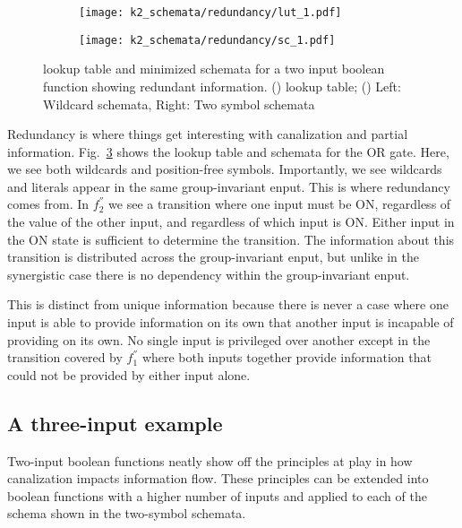 \documentclass[12pt]{article} %
\newcommand{\figref}[1]{Fig.~\ref{fig:#1}}
\begin{document}
\begin{figure}[h]
    \centering
    \begin{subfigure}{0.48\textwidth}
        \centering
        \texttt{[image: k2\_schemata/redundancy/lut\_1.pdf]}
        \label{fig:lut1}
        \caption{\label{fig:lut1}}
    \end{subfigure}
    \begin{subfigure}{0.48\textwidth}
        \centering
        \texttt{[image: k2\_schemata/redundancy/sc\_1.pdf]}
        \label{fig:ts1}
        \caption{\label{fig:ts1}}
    \end{subfigure}
    \caption{lookup table and minimized schemata for a two input boolean 
    function showing redundant information.
    () lookup table;
    () Left: Wildcard schemata, Right: Two symbol schemata}
    \label{fig:rule1}
\end{figure}

Redundancy is where things get interesting with canalization and partial 
information. \figref{rule1} shows the lookup table and schemata for the OR 
gate. Here, we see both wildcards and position-free symbols. Importantly, we 
see wildcards and literals appear in the same group-invariant enput. This is 
where redundancy comes from. In $f^{''}_2$ we see a transition where one input 
must be ON, regardless of the value of the other input, and regardless of which 
input is ON. Either input in the ON state is sufficient to determine the 
transition. The information about this transition is distributed across the 
group-invariant enput, but unlike in the synergistic case there is no 
dependency within the group-invariant enput.

This is distinct from unique information because there is never a case where 
one input is able to provide information on its own that another input is 
incapable of providing on its own. No single input is privileged over another 
except in the transition covered by $f^{''}_1$ where both inputs together 
provide information that could not be provided by either input alone.

\subsection{A three-input example}

Two-input boolean functions neatly show off the principles at play in how 
canalization impacts information flow. These principles can be extended into 
boolean functions with a higher number of inputs and applied to each of the 
schema shown in the two-symbol schemata.
\end{document}
